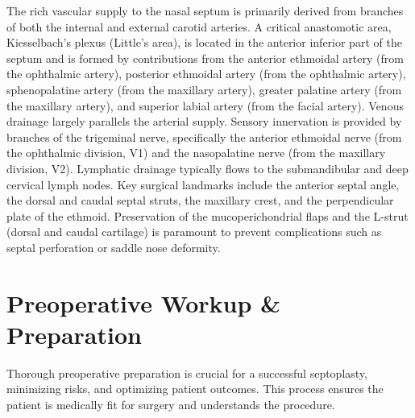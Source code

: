 The rich vascular supply to the nasal septum is primarily derived from branches of both the internal and external carotid arteries. A critical anastomotic area, Kiesselbach's plexus (Little's area), is located in the anterior inferior part of the septum and is formed by contributions from the anterior ethmoidal artery (from the ophthalmic artery), posterior ethmoidal artery (from the ophthalmic artery), sphenopalatine artery (from the maxillary artery), greater palatine artery (from the maxillary artery), and superior labial artery (from the facial artery). Venous drainage largely parallels the arterial supply. Sensory innervation is provided by branches of the trigeminal nerve, specifically the anterior ethmoidal nerve (from the ophthalmic division, V1) and the nasopalatine nerve (from the maxillary division, V2). Lymphatic drainage typically flows to the submandibular and deep cervical lymph nodes. Key surgical landmarks include the anterior septal angle, the dorsal and caudal septal struts, the maxillary crest, and the perpendicular plate of the ethmoid. Preservation of the mucoperichondrial flaps and the L-strut (dorsal and caudal cartilage) is paramount to prevent complications such as septal perforation or saddle nose deformity.

\section*{Preoperative Workup \& Preparation}
Thorough preoperative preparation is crucial for a successful septoplasty, minimizing risks, and optimizing patient outcomes. This process ensures the patient is medically fit for surgery and understands the procedure.

